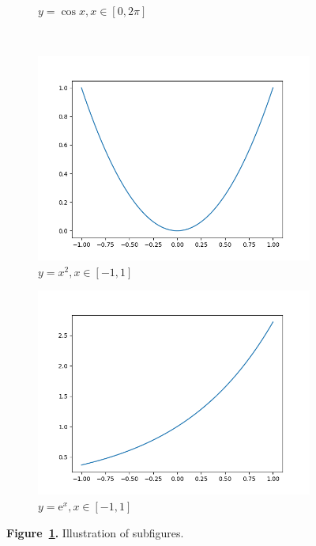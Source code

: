 \begin{figure}
\begin{subfigure}{0.3\linewidth}
        \caption{\(y=\cos x, x\in[0,2\pi]\)}
    \end{subfigure}
    \\
    \begin{subfigure}{0.3\linewidth}
        \includegraphics[width=\linewidth]{../figures/square.png}
        \caption{\(y=x^2, x\in[-1,1]\)}
    \end{subfigure}
    \begin{subfigure}{0.3\linewidth}
        \includegraphics[width=\linewidth]{../figures/exp.png}
        \caption{\(y=\mathrm{e}^x, x\in[-1,1]\)}
    \end{subfigure}
    \caption{\textbf{Figure~\ref{Figure-Subfigures}.} Illustration of subfigures.}\label{Figure-Subfigures}
\end{figure}

